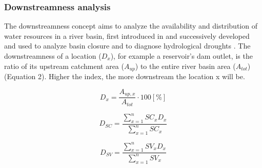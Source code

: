\documentclass[draft]{agujournal2019}
\begin{document}
\subsubsection{Downstreamness analysis}\label{sec:dwn}
The downstreamness concept aims to analyze the availability and distribution of water resources in a river basin, first introduced in  and successively developed and used to analyze basin closure and to diagnose hydrological droughts \cite{VanOel2011,VanOel2018,HvanLangen2021}. The downstreamness of a location ($D_{x}$), for example a reservoir’s dam outlet, is the ratio of its upstream catchment area ($A_{up}$) to the entire river basin area ($A_{tot}$) (Equation 2). Higher the index, the more downstream the location x will be.\\

\begin{linenomath*}
 \begin{equation}\label{Dx}
 D_{x} = \frac{A_{up,x}}{A_{tot}} \cdot 100 [\%]
 \end{equation}
\end{linenomath*}
\begin{linenomath*}
 \begin{equation}\label{DSC}
 D_{SC} = \frac{\sum_{x=1}^{n} SC_{x}D_{x}}{\sum_{x=1}^{n} SC_{x}}
 \end{equation}
\end{linenomath*}
\begin{linenomath*}
 \begin{equation}\label{DSV}
 D_{SV} = \frac{\sum_{x=1}^{n} SV_{x}D_{x}}{\sum_{x=1}^{n} SV_{x}}
 \end{equation}
\end{linenomath*}
\end{document}
